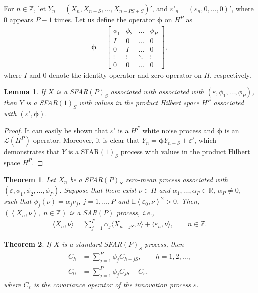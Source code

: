 \documentclass[11pt,a4paper]{article}
\newtheorem{lemma} {Lemma}[section]
\newtheorem{Theorem} {Theorem}[section]
\numberwithin{equation}{section}
\newcommand{\E}{\mathbb{E}}
\begin{document}
For $n\in {\mathbb{Z}}$, let $Y_n=\left(X_n,X_{n-S},\dots,X_{n-PS+S}\right)'$, and $\varepsilon'_n=\left(\varepsilon_n,0,\dots,0\right)'$,  where $0$ appears $P-1$ times. Let us define the operator $\bm{\phi}$ on $H^P$ as
\begin{align}
  \bm{\phi}=
    \begin{bmatrix}
      \phi_1 & \phi_2 & \dots  & \phi_P \\
      I      & 0      & \dots  & 0 \\
      0      & I      & \dots  & 0\\
      \vdots & \vdots & \ddots & \vdots\\
      0      & 0      & \dots  & 0
    \end{bmatrix},
\end{align}
where $I$ and $0$ denote the identity operator and zero operator on $H$, respectively.

\begin{lemma}
  If $X$ is a SFAR$(P)_{S}$ associated with associated with $(\varepsilon,\phi_{1},\dots,\phi_{P})$, then $Y$ is a SFAR$(1)_{S}$ with values in the product Hilbert space $H^P$ associated with $\left(\varepsilon',\bm{\phi}\right).$
\end{lemma}
\begin{proof}
  It can easily be shown that $\varepsilon'$ is a $H^P$ white noise process and $\bm{\phi}$ is an $\mathcal{L}\left(H^P\right)$ operator. Moreover, it is clear that $Y_n=\bm{\phi}Y_{n-S}+\varepsilon'$, which demonstrates that $Y$ is a  SFAR$(1)_{S}$ process with values in the product Hilbert space $H^P$.
\end{proof}

\begin{Theorem}
  Let $X_n$ be a SFAR$(P)_S$ zero-mean process associated with $\left(\varepsilon , \phi_1,\phi_2,\dots,\phi_P\right)$. Suppose that there exist $\nu\in H$ and $\alpha_1,\dots,\alpha_P\in {\mathbb{R}}$, $\alpha_P\neq 0$, such that $\phi_j\left(\nu\right) =\alpha_j\nu_j$, $j=1,\dots, P$ and $\E\left\langle\varepsilon_0,\nu\right\rangle^2>0$. Then, $\left(\left\langle X_n,\nu \right\rangle,\;n \in {\mathbb{Z}}\right)$ is a SAR$(P)$ process, i.e.,
  \begin{align}
    \langle X_n,\nu\rangle = \sum_{j=1}^P \alpha_j \langle X_{n-jS},\nu \rangle + \langle \varepsilon_n,\nu \rangle,
      \qquad n\in {\mathbb{Z}}.
  \end{align}
\end{Theorem}

\begin{Theorem}
  If $X$ is a standard SFAR$(P)_S$ process, then
  \begin{align}
    C_h & = \sum_{j=1}^P\phi_jC_{h-jS},\qquad h=1,2,\dots, \\
    C_0 & = \sum_{j=1}^P\phi_jC_{jS}+C_\varepsilon,
  \end{align}
  where $C_\varepsilon$ is the covariance operator of the innovation process $\varepsilon.$
\end{Theorem}
\end{document}
